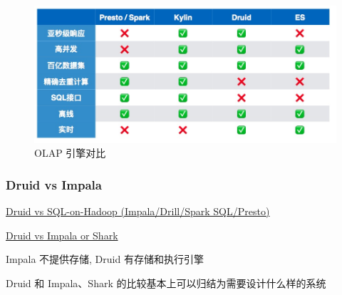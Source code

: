\documentclass[hyperref, UTF-8]{ctexart}
\begin{document}
\begin{figure}[htbp]
\centering
\includegraphics[width=.9\linewidth]{Components/Jietu20171201-174316_2017-12-01_17-43-42.jpg}
\caption{OLAP 引擎对比}
\end{figure}
\subsubsection{Druid vs Impala}
\label{sec:orgdcba50b}
\href{http://druid.io/docs/latest/comparisons/druid-vs-sql-on-hadoop.html}{Druid vs SQL-on-Hadoop (Impala/Drill/Spark SQL/Presto)}

\href{https://github.com/streamlyzer/druidForSL/wiki/Druid-vs-Impala-or-Shark}{Druid vs Impala or Shark}

Impala 不提供存储, Druid 有存储和执行引擎

Druid 和 Impala、Shark 的比较基本上可以归结为需要设计什么样的系统
\end{document}
